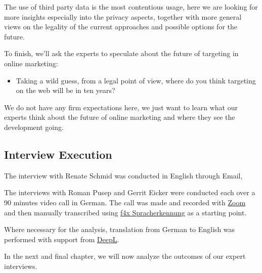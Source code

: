 The use of third party data is the most contentious usage, here we are looking for more insights especially into the privacy aspects, together with more general views on the legality of the current approaches and possible options for the future.

To finish, we'll ask the experts to speculate about the future of targeting in online marketing:
 
\begin{itemize} 
 \item Taking a wild guess, from a legal point of view, where do you think targeting on the web will be in ten years?
\end{itemize}

We do not have any firm expectations here, we just want to learn what our experts think about the future of online marketing and where they see the development going.

\subsection{Interview Execution}

The interview with Renate Schmid was conducted in English through Email,

The interviews with Roman Pusep and Gerrit Eicker were conducted each over a 90 minutes video call in German. The call was made and recorded with \href{https://zoom.us/}{Zoom} and then manually transcribed using \href{https://f4x.audiotranskription.de/}{f4x Spracherkennung} as a starting point. 

Where necessary for the analysis, translation from German to English was performed with support from \href{https://www.deepl.com/en/translator}{DeepL}.

In the next and final chapter, we will now analyze the outcomes of our expert interviews.
